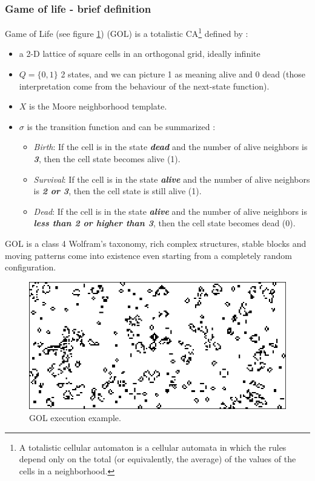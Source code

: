 \subsubsection{Game of life - brief definition} 
Game of Life (see figure \ref{gameoflife}) (GOL)\cite{Conway1970} is a
totalistic CA\footnote{A totalistic cellular automaton is a cellular automata in which the rules depend only on the
total (or equivalently, the average) of the values of the cells in a neighborhood.} defined by :
\begin{itemize}
  \item a 2-D lattice of square cells in an orthogonal grid, ideally infinite
  \item $Q=\{0,1\} $ 2 states, and we can picture 1 as
  meaning alive and 0 dead (those interpretation come from the 	
behaviour of the next-state function).
\item $X$ is the Moore neighborhood template.
\item $\sigma$ is the transition function and can be
summarized :
	\begin{itemize}
	  \item \emph{Birth}: If the cell is in the state \textbf{\textit{dead}} and
	  the number of alive neighbors is \textbf{\textit{3}}, then the cell state
	  becomes alive (1).
	  \item \emph{Survival}: If the cell is in the state \textbf{\textit{alive}}
	  and the number of alive neighbors is \textbf{\textit{2 or 3}}, then the cell
	  state is still alive (1).
	  \item \emph{Dead}: If the cell is in the state \textbf{\textit{alive}} and
	  the number of alive neighbors is \textbf{\textit{less than 2 or higher
	  than 3}}, then the cell state becomes dead (0).
	  \end{itemize}
\end{itemize}

GOL is a class 4 Wolfram's taxonomy, rich complex structures, stable blocks and
moving patterns come into existence even starting from a completely random
configuration. 
\begin{figure}
\centering
\caption{GOL execution example.}
\label{gameoflife}
\includegraphics[scale=0.9]{./images/game-of-life}
\end{figure}
\FloatBarrier


